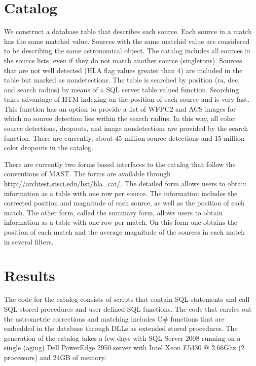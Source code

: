 \section{Catalog}
We construct a database table that describes each source. Each source in a match has the same matchid value. Sources with the same matchid value are considered to be describing the same astronomical object. The catalog includes all sources in the source lists, even if they do not match another source (singletons). Sources that are not well detected (HLA flag values greater than 4) are included in the table but marked as nondetections. The table is searched by position (ra, dec, and search radius) by means of a SQL server table valued function.  Searching takes advantage of HTM indexing on the position of each source and is very fast. This function has an option to provide a list of WFPC2 and ACS images for which no source detection lies within the search radius. In this way, all color source detections, dropouts, and image nondetections are provided by the search function.  There are currently, about 45 million source detections and 15 million color dropouts in the catalog.

There are currently two forms based interfaces to the catalog that follow the conventions of MAST. The forms are available through \url{http://archtest.stsci.edu/hst/hla_cat/}. The detailed form allows users to obtain information as a table with one row per source. The information includes the corrected position and magnitude of each source, as well as the position of each match. The other form, called the summary form, allows users to obtain information as a table with one row per match. On this form one obtains the position of each match and the average magnitude of the sources in each match in several filters.

\section{Results}


The code for the catalog consists  of scripts that contain SQL statements and call SQL stored procedures and user defined SQL functions. The code that carries out the astrometric corrections and matching includes  C\# functions that are embedded in the database through DLLs as extended stored procedures. The generation of the catalog takes a few days  with SQL Server 2008 running on a single (aging) Dell PowerEdge 2950 server with  Intel Xeon E5430 @ 2.66Ghz (2 processors) and 24GB of memory.

